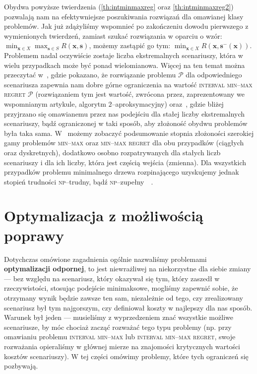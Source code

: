 Obydwa powyższe twierdzenia (\ref{th:intminmaxreg} oraz \ref{th:intminmaxreg2}) pozwalają nam na efektywniejsze poszukiwania rozwiązań dla omawianej klasy problemów. Jak już zdążyliśmy wspomnieć po zakończeniu dowodu pierwszego z wymienionych twierdzeń, zamiast szukać rozwiązania w oparciu o wzór: $\min_{\textbf{x} \in X} \max_{\textbf{s} \in S} R \left( \textbf{x}, \textbf{s} \right)$, możemy zastąpić go tym: $\min_{\textbf{x} \in X} R \left( \textbf{x}, \textbf{s}^{-} \left( \textbf{x} \right) \right)$. Problemem nadal oczywiście zostaje liczba ekstremalnych scenariuszy, która w wielu przypadkach może być ponad wielomianowa. Więcej na ten temat można przeczytać w~\cite{intervalregMST}, gdzie pokazano, że rozwiązanie problemu $\mathcal{P}$ dla odpowiedniego scenariusza zapewnia nam dobre górne ograniczenia na wartość \textsc{interval min--max regret $\mathcal{P}$} (rozwiązaniem tym jest wartość, zwrócona przez, zaprezentowany we wspomnianym artykule, algorytm $2$--aproksymacyjny) oraz~\cite{intervalregMST2}, gdzie bliżej przyjrzano się omawianemu przez nas podejściu dla stałej liczby ekstremalnych scenariuszy, bądź ograniczonej w taki sposób, aby złożoność obydwu problemów była taka sama. W~\cite{DBLP:journals/corr/KasperskiZ14a} możemy zobaczyć podsumowanie stopnia złożoności szerokiej gamy problemów \textsc{min--max} oraz \textsc{min--max regret} dla obu przypadków (ciągłych oraz dyskretnych), dodatkowo osobno rozpatrywanych dla stałych liczb scenariuszy i dla ich liczby, która jest częścią wejścia (zmienna). Dla wszystkich przypadków problemu minimalnego drzewa rozpinającego uzyskujemy jednak stopień trudności \textsc{np}--trudny, bądź \textsc{np}--zupełny~\cite{minmaxApprox}~\cite{intervalregMST2}.

\section{Optymalizacja z możliwością poprawy}

Dotychczas omówione zagadnienia ogólnie nazwaliśmy problemami \textbf{optymalizacji odpornej}, to jest niewrażliwej na niekorzystne dla siebie zmiany --- bez względu na scenariusz, który okazywał się tym, który zaszedł w rzeczywistości, stosując podejście minimaksowe, mogliśmy zapewnić sobie, że otrzymany wynik będzie zawsze ten sam, niezależnie od tego, czy zrealizowany scenariusz był tym najgorszym, czy definiował koszty w najlepszy dla nas sposób. Warunek był jeden --- musieliśmy z wyprzedzeniem znać wszystkie możliwe scenariusze, by móc chociaż zacząć rozważać tego typu problemy (np. przy omawianiu problemu \textsc{interval min--max} lub \textsc{interval min--max regret}, swoje rozważania opieraliśmy w głównej mierze na znajomości krytycznych wartości kosztów scenariuszy). W tej części omówimy problemy, które tych ograniczeń się pozbywają.

